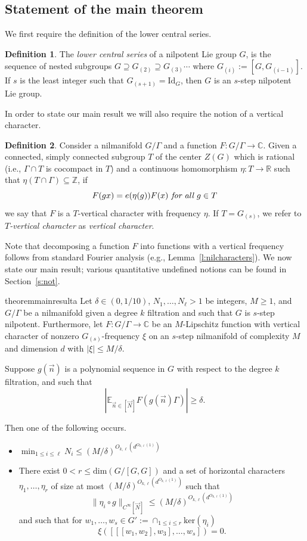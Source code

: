 \documentclass[11pt, a4paper]{amsart}
\theoremstyle{plain}
\theoremstyle{plain}
\theoremstyle{definition}
\newtheorem{definition}{Definition}
\theoremstyle{remark}
\numberwithin{equation}{section}
\numberwithin{lemma}{section}
\numberwithin{proposition}{section}
\numberwithin{corollary}{section}
\numberwithin{definition}{section}
\numberwithin{claim}{section}
\begin{document}
\subsection{Statement of the main theorem}
We first require the definition of the lower central series.
\begin{definition}\label{d:lowercentraseries}
The \emph{lower central series} of a nilpotent Lie group $G$, is the sequence of nested subgroups $G \supseteq G_{(2)} \supseteq G_{(3)} \cdots $ where $G_{(i)} := [G, G_{(i - 1)}]$. If $s$ is the least integer such that $G_{(s + 1)} = \mathrm{Id}_G$, then $G$ is an $s$-step nilpotent Lie group.
\end{definition}
In order to state our main result we will also require the notion of a vertical character.
\begin{definition}
Consider a nilmanifold $G/\Gamma$ and a function $F\colon G/\Gamma\to\mathbb{C}$. Given a connected, simply connected subgroup $T$ of the center $Z(G)$ which is rational (i.e., $\Gamma\cap T$ is cocompact in $T$) and a continuous homomorphism $\eta\colon T\to\mathbb{R}$ such that $\eta(T\cap\Gamma)\subseteq \mathbb{Z}$, if 
\[F(gx)=e(\eta(g))F(x)\emph{ for all }g\in T\]
we say that $F$ is a $T$-vertical character with frequency $\eta$. If $T = G_{(s)}$, we refer to \emph{$T$-vertical character} as \emph{vertical character}.
\end{definition}
Note that decomposing a function $F$ into functions with a vertical frequency follows from standard Fourier analysis (e.g., Lemma~\ref{l:nilcharacters}). We now state our main result; various quantitative undefined notions can be found in Section~\ref{s:not}.
\begin{restatable}{theorem}{mainresulta}\label{t:mainresult1}
Let $\delta\in (0,1/10)$, $N_1, \ldots, N_\ell > 1$ be integers, $M \ge 1$, and $G/\Gamma$ be a nilmanifold given a degree $k$ filtration and such that $G$ is $s$-step nilpotent. Furthermore, let $F\colon G/\Gamma \to \mathbb{C}$ be an $M$-Lipschitz function with vertical character of nonzero $G_{(s)}$-frequency $\xi$ on an $s$-step nilmanifold of complexity $M$ and dimension $d$ with $|\xi| \le M/\delta$. 

Suppose $g(\vec{n})$ is a polynomial sequence in $G$ with respect to the degree $k$ filtration, and such that
\[|\mathbb{E}_{\vec{n} \in [\vec{N}]} F(g(\vec{n})\Gamma)| \ge \delta.\]

Then one of the following occurs.
\begin{itemize}
    \item $\min_{1\le i\le \ell}N_i\le (M/\delta)^{O_{k,\ell}(d^{O_{k,\ell}(1)})}$
    \item There exist $0< r\le \mathrm{dim}(G/[G,G])$ and a set of horizontal characters $\eta_1, \dots, \eta_r$ of size at most $(M/\delta)^{O_{k,\ell}(d^{O_{k,\ell}(1)})}$ such that 
    \[\|\eta_i \circ g\|_{C^\infty[\vec{N}]} \le (M/\delta)^{O_{k,\ell}(d^{O_{k,\ell}(1)})}\]
    and such that for $w_1,\ldots,w_s\in G' := \cap_{1\le i\le r}\mathrm{ker}(\eta_i)$ 
    \[\xi([[[w_1, w_2], w_3], \ldots,w_s]) = 0.\]
\end{itemize}
\end{restatable}
\end{document}
